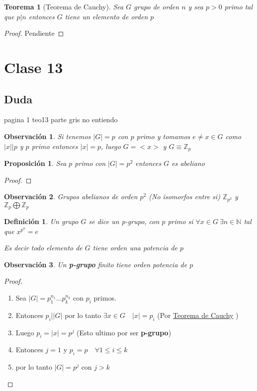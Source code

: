 \documentclass[10pt]{extarticle}
\theoremstyle{break}
\newtheorem{theorem}{Teorema}[section]
\newtheorem{proposition}{Proposición}
\newtheorem*{remark}{Observación}
\newtheorem{definition}{Definición}[section]
\theoremstyle{definition}
\begin{document}
\begin{theorem}[Teorema de Cauchy]\label{12.2}
	Sea $G$ grupo de orden $ n $ y sea $ p>0 $ primo tal que $ p|n $ entonces $G$ tiene un elemento de orden $ p $
\end{theorem}

\begin{proof}
	Pendiente
\end{proof}

\section{Clase 13}

\subsection{Duda}
pagina 1 teo13 parte gris no entiendo
\begin{remark}
	Si tenemos $\lvert G \rvert =p$ con $p$ primo y tomamos $e\neq x\in G$ como $\lvert x \rvert |p$ y $p$ primo entonces $\lvert x \rvert =p$, luego $G=<x>$ y $G\equiv \mathbb{Z}_{p}$   
\end{remark}

\begin{proposition}
	Sea $p$ primo con $\lvert G \rvert =p^{2}$ entonces $G$ es abeliano 
\end{proposition}
\begin{proof}
	
\end{proof}

\begin{remark}
	Grupos abelianos de orden $p^{2}$ (No isomorfos entre si) $\mathbb{Z}_{p^{2}}$ y $\mathbb{Z}_{p}\bigoplus \mathbb{Z}_{p}$ 
\end{remark}

\begin{definition}
	Un grupo $G$ se dice un p-grupo, con $p$ primo si $\forall x\in G \ \exists n\in \mathbb{N} $ tal que $x^{p^{n}}=e$ 
	
	Es decir todo elemento de $G$ tiene orden una potencia de $p$ 
\end{definition}

\begin{remark}
	Un \textbf{p-grupo} finito tiene orden potencia de $p$  
\end{remark}
\begin{proof}
	\begin{enumerate}
		\item Sea $\lvert G \rvert =p_{1}^{n_{1}}\ldots p_{k}^{n_{k}}$ con $p_{i}$ primos.
		\item Entonces $p_{i}\big|\lvert G \rvert $ por lo tanto $\exists x\in G\quad \lvert x \rvert = p_{i}$ (Por \hyperref[12.2]{Teorema de Cauchy} )
		\item Luego $p_{i}=\lvert x \rvert =p^j $ (Esto ultimo por ser \textbf{p-grupo}) 
		\item Entonces $j=1$ y $p_{i}=p\quad \forall 1\leq i\leq k$ 
		\item por lo tanto $\lvert G \rvert =p^j$ con $j>k$  
	\end{enumerate}  
\end{proof}
\end{document}
